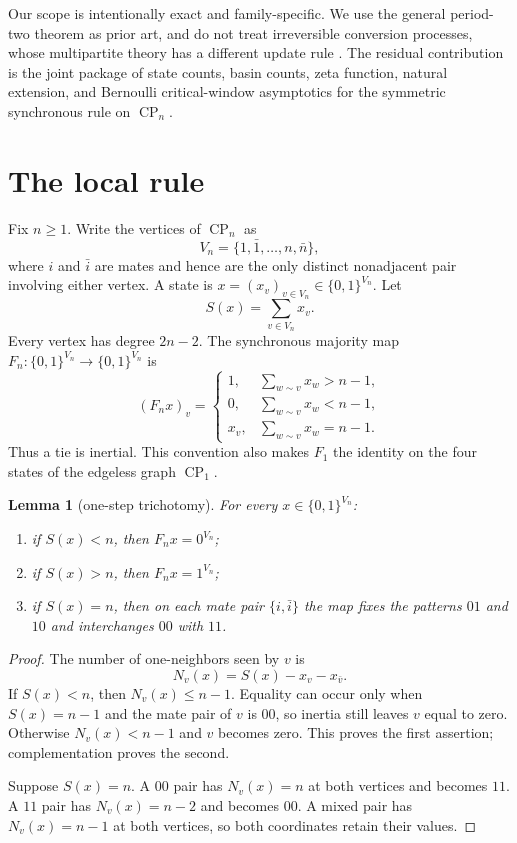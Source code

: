 \documentclass[11pt,a4paper]{amsart}
\newtheorem{lemma}[theorem]{Lemma}
\theoremstyle{definition}
\theoremstyle{remark}
\newcommand{\CP}{\operatorname{CP}}
\begin{document}
Our scope is intentionally exact and family-specific.  We use the general
period-two theorem as prior art, and do not treat irreversible conversion
processes, whose multipartite theory has a different update rule
\cite{AdamsEtAl2011}.  The residual contribution is the joint package of
state counts, basin counts, zeta function, natural extension, and Bernoulli
critical-window asymptotics for the symmetric synchronous rule on
$\CP_n$.

\section{The local rule}

Fix $n\geq1$.  Write the vertices of $\CP_n$ as
\[
 V_n=\{1,\bar1,\ldots,n,\bar n\},
\]
where $i$ and $\bar i$ are mates and hence are the only distinct
nonadjacent pair involving either vertex.  A state is
$x=(x_v)_{v\in V_n}\in\{0,1\}^{V_n}$.  Let
\[
 S(x)=\sum_{v\in V_n}x_v.
\]
Every vertex has degree $2n-2$.  The synchronous majority map
$F_n:\{0,1\}^{V_n}\to\{0,1\}^{V_n}$ is
\[
 (F_nx)_v=
 \begin{cases}
 1,&\sum_{w\sim v}x_w>n-1,\\
 0,&\sum_{w\sim v}x_w<n-1,\\
 x_v,&\sum_{w\sim v}x_w=n-1.
 \end{cases}
\]
Thus a tie is inertial.  This convention also makes $F_1$ the identity on
the four states of the edgeless graph $\CP_1$.

\begin{lemma}[one-step trichotomy]\label{lem:trichotomy}
For every $x\in\{0,1\}^{V_n}$:
\begin{enumerate}
\item if $S(x)<n$, then $F_nx=0^{V_n}$;
\item if $S(x)>n$, then $F_nx=1^{V_n}$;
\item if $S(x)=n$, then on each mate pair $\{i,\bar i\}$ the map fixes
the patterns $01$ and $10$ and interchanges $00$ with $11$.
\end{enumerate}
\end{lemma}

\begin{proof}
The number of one-neighbors seen by $v$ is
\[
 N_v(x)=S(x)-x_v-x_{\bar v}.
\]
If $S(x)<n$, then $N_v(x)\leq n-1$.  Equality can occur only when
$S(x)=n-1$ and the mate pair of $v$ is $00$, so inertia still leaves $v$
equal to zero.  Otherwise $N_v(x)<n-1$ and $v$ becomes zero.  This proves
the first assertion; complementation proves the second.

Suppose $S(x)=n$.  A $00$ pair has $N_v(x)=n$ at both vertices and becomes
$11$.  A $11$ pair has $N_v(x)=n-2$ and becomes $00$.  A mixed pair has
$N_v(x)=n-1$ at both vertices, so both coordinates retain their values.
\end{proof}
\end{document}
